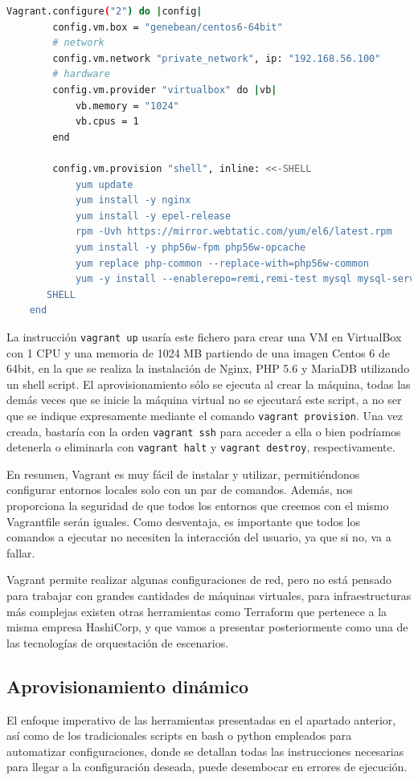 \begin{lstlisting}[language=Bash, caption=Ejemplo de Vagrantfile]
	Vagrant.configure("2") do |config|
	    config.vm.box = "genebean/centos6-64bit"
	    # network
	    config.vm.network "private_network", ip: "192.168.56.100"
	    # hardware
	    config.vm.provider "virtualbox" do |vb|
	        vb.memory = "1024"
	        vb.cpus = 1
	    end

	    config.vm.provision "shell", inline: <<-SHELL
	        yum update
	        yum install -y nginx
	        yum install -y epel-release
	        rpm -Uvh https://mirror.webtatic.com/yum/el6/latest.rpm
	        yum install -y php56w-fpm php56w-opcache
	        yum replace php-common --replace-with=php56w-common
	        yum -y install --enablerepo=remi,remi-test mysql mysql-server
	   SHELL
	end 
\end{lstlisting}

	La instrucción \texttt{vagrant up} usaría este fichero para crear una VM en VirtualBox con 1 CPU y una memoria de 1024 MB partiendo de una imagen Centos 6 de 64bit, en la que se realiza la instalación de Nginx, PHP 5.6 y MariaDB utilizando un shell script. El aprovisionamiento sólo se ejecuta al crear la máquina, todas las demás veces que se inicie la máquina virtual no se ejecutará este script, a no ser que se indique expresamente mediante el comando \texttt{vagrant provision}. Una vez creada, bastaría con la orden \texttt{vagrant ssh} para acceder a ella o bien podríamos detenerla o eliminarla con \texttt{vagrant halt} y \texttt{vagrant destroy}, respectivamente.

	En resumen, Vagrant es muy fácil de instalar y utilizar, permitiéndonos configurar entornos locales solo con un par de comandos. Además, nos proporciona la seguridad de que todos los entornos que creemos con el mismo Vagrantfile serán iguales. Como desventaja, es importante que todos los comandos a ejecutar no necesiten la interacción del usuario, ya que si no, va a fallar.

	Vagrant permite realizar algunas configuraciones de red, pero no está pensado para trabajar con grandes cantidades de máquinas virtuales, para infraestructuras más complejas existen otras herramientas como Terraform que pertenece a la misma empresa HashiCorp, y que vamos a presentar posteriormente como una de las tecnologías de orquestación de escenarios.

	\clearpage

\subsection{Aprovisionamiento dinámico} \label{sec:din}
	El enfoque imperativo de las herramientas presentadas en el apartado anterior, así como de los tradicionales scripts en bash o python empleados para automatizar configuraciones, donde se detallan todas las instrucciones necesarias para llegar a la configuración deseada, puede desembocar en errores de ejecución. 

